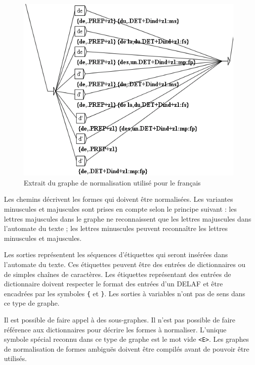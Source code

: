 \bigskip
\begin{figure}[!h]
\begin{center}
\includegraphics[width=13.5cm]{resources/img/fig6-3.png}
\caption{Extrait du graphe de normalisation utilisé pour le
français\label{fig-tfst-normalization-grammar}}
\end{center}
\end{figure}

\noindent Les chemins décrivent les formes qui doivent être normalisées. Les variantes minuscules
et majuscules sont prises en compte selon le principe suivant : les lettres majuscules dans
le graphe ne reconnaissent que les lettres majuscules dans l’automate du texte ; les lettres
minuscules peuvent reconnaître les lettres minuscules et majuscules.

\bigskip
\noindent Les sorties représentent les séquences d’étiquettes qui seront insérées dans l’automate
du texte. Ces étiquettes peuvent être des entrées de dictionnaires ou de simples chaînes
de caractères. Les étiquettes représentant des entrées de dictionnaire doivent respecter le
format des entrées d’un DELAF et être encadrées par les symboles
\verb+{+ et \verb+}+. Les sorties à variables n’ont pas de sens dans ce type de graphe.


\bigskip
\noindent Il est possible de faire appel à des sous-graphes. Il n’est pas possible de faire référence
aux dictionnaires pour décrire les formes à normaliser. L’unique symbole spécial reconnu
dans ce type de graphe est le mot vide \verb+<E>+.
Les graphes de normalisation de formes ambiguës doivent être compilés avant de pouvoir être
utilisés.


